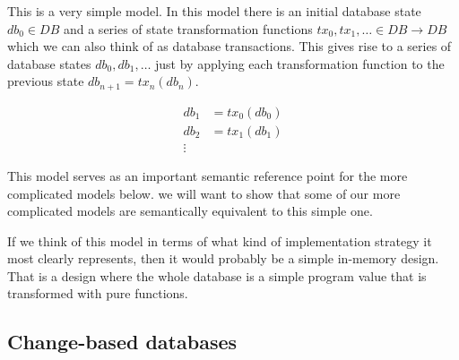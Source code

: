 \documentclass[11pt,a4paper]{article}
\begin{document}
This is a very simple model. In this model there is an initial database state
$\mathit{db}_0 \in \mathit{DB}$ and a series of state transformation functions
$\mathit{tx}_0, \mathit{tx}_1, \ldots \in \mathit{DB} \to \mathit{DB} $ which we can also think of as database
transactions. This gives rise to a series of database states
$\mathit{db}_0, \mathit{db}_1, \ldots$ just by applying each transformation
function to the previous state
$\mathit{db}_{n+1} = \mathit{tx}_n(\mathit{db}_n)$.

\begin{center}
\begin{align*}
 \mathit{db}_1 & = \mathit{tx}_0(\mathit{db}_0) \\
 \mathit{db}_2 & = \mathit{tx}_1(\mathit{db}_1) \\
 \vdots
\end{align*}
\end{center}
This model serves as an important semantic reference point for the more
complicated models below. we will want to show that some of our more
complicated models are semantically equivalent to this simple one.

If we think of this model in terms of what kind of implementation strategy it
most clearly represents, then it would probably be a simple in-memory design.
That is a design where the whole database is a simple program value that is
transformed with pure functions.

\subsection{Change-based databases}
\end{document}
